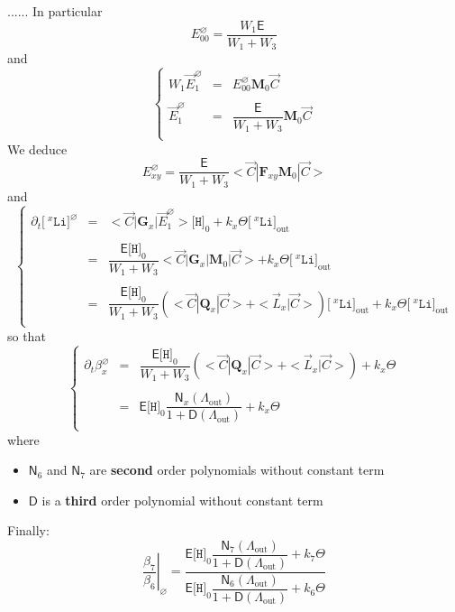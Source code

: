\documentclass[aps,onecolumn,11pt]{revtex4}
\newcommand{\mychem}[1]{\mathtt{#1}}
\newcommand{\myconc}[1]{\big[#1\big]}
\newcommand{\spLi}[1]{{\!~^{#1}\mychem{Li}}}
\newcommand{\Li}[1]{\myconc{\spLi{#1}}}
\newcommand{\spproton}{\mychem{H}}
\newcommand{\proton}{\myconc{\spproton}}
\newcommand{\myout}[1]{{#1}_{\mathrm{out}}}
\newcommand{\mymat}[1]{{\bm{#1}}}
\newcommand{\LiAll}{\Lambda}
\newcommand{\LiAllOut}{\myout{\LiAll}}
\begin{document}
......
In particular
\begin{equation}
	E_{00}^\varnothing = \dfrac{W_1 \mathsf{E}}{W_1+W_3}
\end{equation}
and
\begin{equation}
\left\lbrace
\begin{array}{rcl}
	W_1 \vec{E}_1^\varnothing & = & E_{00}^\varnothing  \mymat{M}_0 \vec{C}\\
	\\
	\vec{E}_1^\varnothing     & = & \dfrac{\mathsf{E}}{W_1+W_3}\mymat{M}_0 \vec{C}\\
\end{array}
\right.
\end{equation}
We deduce
\begin{equation}
	E_{xy}^\varnothing = \dfrac{\mathsf{E}}{W_1+W_3} <\vec{C}|\mymat{F}_{xy}\mymat{M}_0|\vec{C}>
\end{equation}
and
\begin{equation}
\left\lbrace
\begin{array}{rcl}
	\partial_t \Li{x}^\varnothing & = & <\vec{C}|\mymat{G}_x|\vec{E}_1^\varnothing> \proton_0 + k_x \Theta \myout{\Li{x}}\\
	\\
	 & = & \dfrac{\mathsf{E}\proton_0}{W_1+W_3} <\vec{C}|\mymat{G}_x|\mymat{M}_0|\vec{C}> + k_x \Theta \myout{\Li{x}}\\
	 \\
	 & = & \dfrac{\mathsf{E}\proton_0}{W_1+W_3} \left( <\vec{C}|\mymat{Q}_x|\vec{C}> + <\vec{L}_x|\vec{C}>\right)\myout{\Li{x}} + k_x \Theta \myout{\Li{x}}  \\
\end{array}
\right.
\end{equation}
so that
\begin{equation}
\left\lbrace
\begin{array}{rcl}
\partial_t \beta_x^\varnothing & = & \dfrac{\mathsf{E}\proton_0}{W_1+W_3} \left( <\vec{C}|\mymat{Q}_x|\vec{C}> + <\vec{L}_x|\vec{C}>\right) + k_x \Theta \\
\\
& = & \mathsf{E}\proton_0 \dfrac{\mathsf{N}_x(\LiAllOut)}{1+\mathsf{D}(\LiAllOut)} + k_x \Theta \\
\end{array}
\right.
\end{equation}
where 
\begin{itemize}
\item ${\mathsf{N}_6}$ and  ${\mathsf{N}_7}$ are  {\bf second} order polynomials without constant term
\item ${\mathsf{D}}$ is a {\bf third } order polynomial without constant term
\end{itemize}
Finally:
\begin{equation}
\left.\dfrac{\beta_7}{\beta_6}\right\vert_{\varnothing} = 
\dfrac{
\mathsf{E}\proton_0 \dfrac{\mathsf{N}_7(\LiAllOut)}{1+\mathsf{D}(\LiAllOut)} + k_7 \Theta 
}
{
\mathsf{E}\proton_0 \dfrac{\mathsf{N}_6(\LiAllOut)}{1+\mathsf{D}(\LiAllOut)} + k_6 \Theta 
}
\end{equation}
\end{document}
